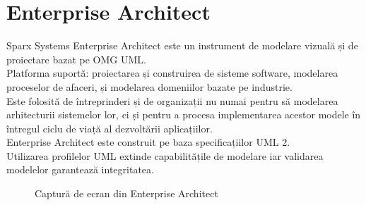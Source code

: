 \section{Enterprise Architect} 
Sparx Systems Enterprise Architect este un instrument de modelare vizuală și de proiectare bazat pe OMG UML.
\vspace{6pt}
\\Platforma suportă: proiectarea și construirea de sisteme software, modelarea proceselor de afaceri, și modelarea domeniilor bazate pe industrie.
\vspace{6pt}
\\Este folosită de întreprinderi și de organizații nu numai pentru să modelarea arhitecturii sistemelor lor, ci și pentru a procesa implementarea acestor modele în întregul ciclu de viață al dezvoltării aplicațiilor.
\vspace{6pt}
\\Enterprise Architect este construit pe baza specificațiilor UML 2.
\vspace{6pt}
\\Utilizarea profilelor UML extinde capabilitățile de modelare iar validarea modelelor garantează integritatea.
\begin{figure}[h!]
  \centering
  \caption{Captură de ecran din Enterprise Architect}
  \end{figure}	

